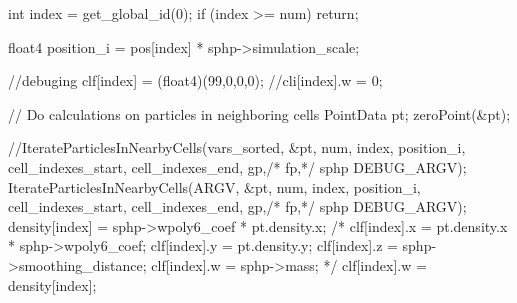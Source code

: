 \begin{cppcode}{0}
{    int index = get_global_id(0);
    if (index >= num) return;

    float4 position_i = pos[index] * sphp->simulation_scale;

    //debuging
    clf[index] = (float4)(99,0,0,0);
    //cli[index].w = 0;

    // Do calculations on particles in neighboring cells
    PointData pt;
    zeroPoint(&pt);

    //IterateParticlesInNearbyCells(vars_sorted, &pt, num, index, position_i, cell_indexes_start, cell_indexes_end, gp,/* fp,*/ sphp DEBUG_ARGV);
    IterateParticlesInNearbyCells(ARGV, &pt, num, index, position_i, cell_indexes_start, cell_indexes_end, gp,/* fp,*/ sphp DEBUG_ARGV);
    density[index] = sphp->wpoly6_coef * pt.density.x;
    /*
    clf[index].x = pt.density.x * sphp->wpoly6_coef;
    clf[index].y = pt.density.y;
    clf[index].z = sphp->smoothing_distance;
    clf[index].w = sphp->mass;
    */
    clf[index].w = density[index];
}

\end{cppcode}

